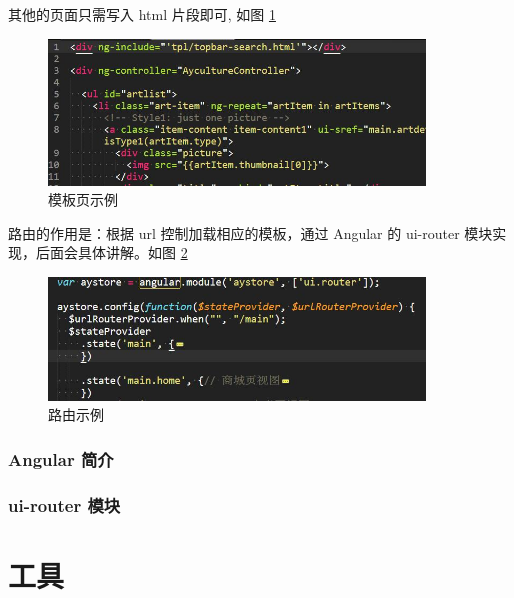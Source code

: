 \documentclass[UTF8]{ctexbook}
\begin{document}
{{                其他的页面只需写入 html 片段即可, 如图 \ref{fig:tpl}

                \begin{figure}[H]
                  \centering
                  \includegraphics[width=10cm]{./img/tpl.jpg}
                  \caption{模板页示例}
                  \label{fig:tpl}
                \end{figure}

                路由的作用是：根据 url 控制加载相应的模板，通过 Angular 的 ui-router 模块实现，后面会具体讲解。如图 \ref{fig:router}

                \begin{figure}[H]
                  \centering
                  \includegraphics[width=10cm]{./img/router.jpg}
                  \caption{路由示例}
                  \label{fig:router}
                \end{figure}

            \subsubsection{Angular 简介}
              \label{subsubsec:angular_简介}

            \subsubsection{ui-router 模块}
              \label{subsubsec:ui_router_模块}





    \section{工具}
      \label{sec:工具}
}}
\end{document}
